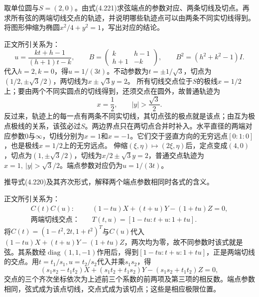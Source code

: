 取单位圆与\(S=(2,0)\)。由式\textup{(4.221)}求弦端点的参数对应、两条切线及切点。再求所有弦的两端切线交点的轨迹，并说明哪些轨迹点可以由两条不同实切线得到。将图形伸缩为椭圆\(x^2/4+y^2=1\)，写出对应的结论。

\par\smallskip\noindent 正文所引关系为：
\begin{equation*}
u=\frac{kt+h-1}{(h+1)t-k},\qquad
 B=\begin{pmatrix}k&h-1\\h+1&-k\end{pmatrix},\qquad
 B^2=(h^2+k^2-1)I.
\end{equation*}
\solutionanswer
代入\(h=2,k=0\)，得\(u=1/(3t)\)。不动参数为\(t=\pm1/\sqrt3\)，切点为\((1/2,\pm\sqrt3/2)\)，两切线为\(x\pm\sqrt3y=2\)。
所有切线交点位于\(S\)的极线\(x=1/2\)上；要由两个不同实圆点的切线得到，还须交点在圆外，故普通轨迹为
\[
 x=\frac12,\qquad |y|>\frac{\sqrt3}{2}.
\]
反过来，轨迹上的每一点有两条不同实切线，其切点弦的极点就是该点；由互为极点极线的关系，该弦必过\(S\)。两边界点只在两切点合并时补入。水平直径的两端对应参数\(0\)与\(\infty\)，切线分别为\(x=1\)和\(x=-1\)。它们交于竖直方向的无穷远点\([0:1:0]\)，也是极线\(x=1/2\)上的无穷远点。
伸缩\((\xi,\eta)\mapsto(2\xi,\eta)\)后，定点变成\((4,0)\)，切点为\((1,\pm\sqrt3/2)\)，切线为\(x/2\pm\sqrt3y=2\)，普通交点轨迹为\(x=1,\ |y|>\sqrt3/2\)。端点参数对应仍为\(u=1/(3t)\)。


推导式\textup{(4.220)}及其齐次形式，解释两个端点参数相同时各式的含义。

\par\smallskip\noindent 正文所引关系为：
\begin{equation*}
\begin{aligned}
 C(t)C(u):\quad &(1-tu)X+(t+u)Y-(1+tu)Z=0,\\
 \text{两端切线交点：}\quad &T(t,u)=[1-tu:t+u:1+tu].
 \end{aligned}
\end{equation*}
\solutionanswer
将\(C(t)=(1-t^2,2t,1+t^2)^T\)与\(C(u)\)代入\((1-tu)X+(t+u)Y-(1+tu)Z\)，两次均为零，故不同参数时该式就是弦。其系数经\(\operatorname{diag}(1,1,-1)\)作用后，得到\([1-tu:t+u:1+tu]\)，正是两端切线的交点。用\(t=t_1/s_1,u=t_2/s_2\)代入并乘\(s_1s_2\)，得
\[
 (s_1s_2-t_1t_2)X+(s_1t_2+t_1s_2)Y-(s_1s_2+t_1t_2)Z=0,
\]
交点的三个齐次坐标依次为上述前三个系数的前两项及第三项的相反数。端点参数相同，弦式成为该点切线，交点式成为该切点；这些是相应极限位置。


